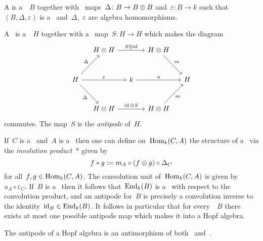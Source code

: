 \begin{definition}
  A \emph{} is a~~$B$ together with~ maps~$\Delta \colon B \to B \mathbin{\otimes} B$ and~$\varepsilon \colon B \to k$ such that~$(B,\Delta,\varepsilon)$ is a~ and~$\Delta$,~$\varepsilon$ are algebra homomorphisms.
\end{definition}


\begin{definition}
  A~ is a~~$H$ together with a~ map~$S \colon H \to H$ which makes the diagram
  \[
    \begin{tikzcd}[column sep = small, row sep = large]
        {}
      & H \tensor H
        \arrow{rr}[above]{S \tensor \id}
      & {}
      & H \tensor H
        \arrow{dr}[above right]{m}
      & {}
      \\
        H
        \arrow{ur}[above left]{\Delta}
        \arrow{rr}[above]{\varepsilon}
        \arrow{dr}[below left]{\Delta}
      & {}
      & k
        \arrow{rr}[above]{u}
      & {}
      & H
      \\
        {}
      & H \tensor H
        \arrow{rr}[above]{\id \tensor S}
      & {}
      & H \tensor H
        \arrow{ur}[below right]{m}
      & {}
    \end{tikzcd}
  \]
  commutes.
  The map~$S$ is the \emph{antipode} of~$H$.
\end{definition}


\begin{remark}
  If~$C$ is a~ and~$A$ is a~ then one can define on~$\operatorname{Hom}_k(C,A)$ the structure of a~ via the \emph{involution product}~$*$ given by
  \[
              f * g
    \coloneqq  m_A \circ (f \mathbin{\otimes} g) \circ \Delta_C
  \]
  for all~$f, g \in \operatorname{Hom}_k(C,A)$.
  The convolution unit of~$\operatorname{Hom}_k(C,A)$ is given by~$u_A \circ \varepsilon_C$.
  If~$B$ is a~ then it follows that~$\operatorname{End}_k(B)$ is a~ with respect to the convolution product, and an antipode for~$B$ is precisely a convolution inverse to the identity~$\operatorname{id}_B \in \operatorname{End}_k(B)$.
  It follows in particular that for every~~$B$ there exists at most one possible antipode map which makes it into a Hopf algebra.
  
  The antipode of a Hopf algebra is an antimorphism of both~ and~.
\end{remark}



